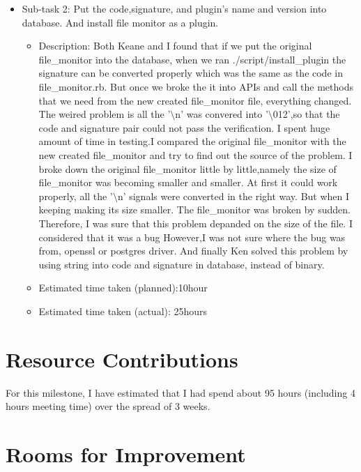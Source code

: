 \documentclass{article}
\begin{document}
\begin{itemize}
     \begin{itemize}
            \item Sub-task 2: Put the code,signature, and plugin's name and version into database. And install                  file monitor as a plugin.
	            \begin{itemize}
				    \item Description: Both Keane and I found that if we put the original file\_monitor into the database, when we ran ./script/install\_plugin the signature can be converted properly which was the same as the code in file\_monitor.rb. But once we broke the it into APIs and call the methods that we need from the new created file\_monitor file, everything changed. The weired problem is all the '$\setminus$n' was convered into '$\setminus$012',so that the code and signature pair could not pass the verification. I spent huge amount of time in testing.I compared the original file\_monitor with the new created file\_monitor and try to find out the source of the problem. I broke down the original file\_monitor little by little,namely the size of file\_monitor was becoming smaller and smaller. At first it could work properly, all the '$\setminus$n' signals were converted in the right way. But when I keeping making its size smaller. The file\_monitor was broken by sudden. Therefore, I was sure that this problem depanded on the size of the file. I considered that it was a bug 
                                   However,I was not sure where the bug was from, openssl or postgres driver. And finally Ken solved this problem by using string into code and signature in database, instead of binary.
					\item Estimated time taken (planned):10hour
					\item Estimated time taken (actual): 25hours
		     \end{itemize}
                     \end{itemize}
  \end{itemize}

\section*{Resource Contributions}

For this milestone, I have estimated that I had spend about 95 hours (including 4 hours meeting time) over the spread of 3 weeks.

\section*{Rooms for Improvement}
\end{document}
